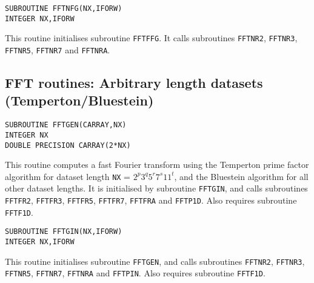\documentclass[dvips]{article}
\begin{document}
\begin{verbatim}
SUBROUTINE FFTNFG(NX,IFORW)
INTEGER NX,IFORW
\end{verbatim}
This routine initialises subroutine {\tt FFTFFG}.  It calls subroutines
{\tt FFTNR2}, {\tt FFTNR3}, {\tt FFTNR5}, {\tt FFTNR7} and {\tt FFTNRA}.

\subsection*{FFT routines: Arbitrary length datasets (Temperton/Bluestein)}
\begin{verbatim}
SUBROUTINE FFTGEN(CARRAY,NX)
INTEGER NX
DOUBLE PRECISION CARRAY(2*NX)
\end{verbatim}
This routine computes a fast Fourier transform using the Temperton prime
factor algorithm for dataset length {\tt NX} =
$2^{p}3^{q}5^{r}7^{s}11^{t}$, and the Bluestein algorithm for all other
dataset lengths. 
It is initialised by subroutine {\tt FFTGIN}, and 
calls subroutines {\tt FFTFR2}, {\tt FFTFR3}, {\tt FFTFR5},
{\tt FFTFR7}, {\tt FFTFRA} and {\tt FFTP1D}.  Also requires subroutine {\tt
FFTF1D}.

\begin{verbatim}
SUBROUTINE FFTGIN(NX,IFORW)
INTEGER NX,IFORW
\end{verbatim}
This routine initialises subroutine {\tt FFTGEN}, and calls subroutines
{\tt FFTNR2}, {\tt FFTNR3}, {\tt FFTNR5},
{\tt FFTNR7}, {\tt FFTNRA} and {\tt FFTPIN}.  Also requires subroutine
{\tt FFTF1D}.
\end{document}
